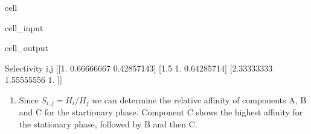 \documentclass[letterpaper,10pt,english]{jupyterBook}
\begin{document}
\begin{sphinxuseclass}{cell}\begin{sphinxVerbatimInput}

\begin{sphinxuseclass}{cell_input}
\begin{sphinxVerbatim}[commandchars=\\\{\}]

\PYG{p}{[}\PYG{p}{]} 

   
       
        \PYG{p}{[}\PYG{p}{]}\PYG{p}{[}\PYG{p}{]}\PYG{p}{[}\PYG{p}{]}

\end{sphinxVerbatim}

\end{sphinxuseclass}\end{sphinxVerbatimInput}
\begin{sphinxVerbatimOutput}

\begin{sphinxuseclass}{cell_output}
\begin{sphinxVerbatim}[commandchars=\\\{\}]
Selectivity i,j
 [[1.         0.66666667 0.42857143]
 [1.5        1.         0.64285714]
 [2.33333333 1.55555556 1.        ]]
\end{sphinxVerbatim}

\end{sphinxuseclass}\end{sphinxVerbatimOutput}

\end{sphinxuseclass}\begin{enumerate}
%
\setcounter{enumi}{2}
\item {} 
\sphinxAtStartPar
Since \(S_{i,j}=H_i/H_j\) we can determine the relative affinity of components A, B and C for the startionary phase. Component C shows the highest affinity for the stationary phase, followed by B and then C.

\end{enumerate}
\end{document}
